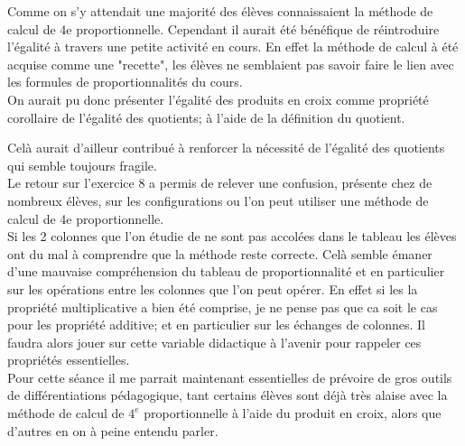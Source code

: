 Comme on s'y attendait une majorité des élèves connaissaient la méthode de calcul de 4e proportionnelle.
Cependant il aurait été bénéfique de réintroduire l'égalité à travers une petite activité en cours.
En effet la méthode de calcul à été acquise comme une "recette",
les élèves ne semblaient pas savoir faire le lien avec les formules de proportionnalités du cours.\\
On aurait pu donc présenter l'égalité des produits en croix comme propriété corollaire de l'égalité des quotients;
à l'aide de la définition du quotient.


Celà aurait d'ailleur contribué à renforcer la nécessité de l'égalité des quotients qui semble toujours fragile.\\

Le retour sur l'exercice 8 a permis de relever une confusion,
présente chez de nombreux élèves,
sur les configurations ou l'on peut utiliser une méthode de calcul de 4e proportionnelle.\\
Si les 2 colonnes que l'on étudie de ne sont pas accolées dans le tableau les élèves ont du mal à comprendre que la méthode reste correcte.
Celà semble émaner d'une mauvaise compréhension du tableau de proportionnalité et en particulier sur les opérations entre les colonnes que l'on peut opérer.
En effet si les la propriété multiplicative a bien été comprise, je ne pense pas que ca soit le cas pour les propriété additive;
et en particulier sur les échanges de colonnes.
Il faudra alors jouer sur cette variable didactique à l'avenir pour rappeler ces propriétés essentielles.\\

Pour cette séance il me parrait maintenant essentielles de prévoire de gros outils de différentiations pédagogique,
tant certains élèves sont déjà très alaise avec la méthode de calcul de $4^e$ proportionnelle à l'aide du produit en croix,
alors que d'autres en on à peine entendu parler.